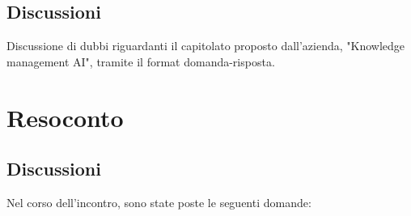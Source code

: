 \documentclass[12pt]{article}
\begin{document}
\subsection{Discussioni} \label{subsec:discussione}
Discussione di dubbi riguardanti il capitolato proposto dall'azienda, "Knowledge management AI", tramite il format domanda-risposta.


\section{Resoconto} \label{sec:resoconto}
\subsection{Discussioni} \label{subsec:resdiscussione}
Nel corso dell'incontro, sono state poste le seguenti domande:
\end{document}
